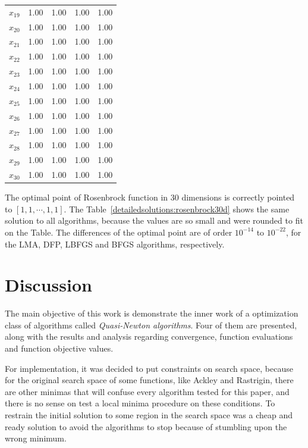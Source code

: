 \documentclass[conference]{IEEEtran}
\begin{document}
\begin{table}[H]
\begin{tabular}{lrrrr}
$x_{19}$ &     1.00 &     1.00 &     1.00 &     1.00 \\
$x_{20}$ &     1.00 &     1.00 &     1.00 &     1.00 \\
$x_{21}$ &     1.00 &     1.00 &     1.00 &     1.00 \\
$x_{22}$ &     1.00 &     1.00 &     1.00 &     1.00 \\
$x_{23}$ &     1.00 &     1.00 &     1.00 &     1.00 \\
$x_{24}$ &     1.00 &     1.00 &     1.00 &     1.00 \\
$x_{25}$ &     1.00 &     1.00 &     1.00 &     1.00 \\
$x_{26}$ &     1.00 &     1.00 &     1.00 &     1.00 \\
$x_{27}$ &     1.00 &     1.00 &     1.00 &     1.00 \\
$x_{28}$ &     1.00 &     1.00 &     1.00 &     1.00 \\
$x_{29}$ &     1.00 &     1.00 &     1.00 &     1.00 \\
$x_{30}$ &     1.00 &     1.00 &     1.00 &     1.00 \\
\bottomrule
\end{tabular}
\end{table}

The optimal point of Rosenbrock function in 30 dimensions is correctly pointed to $\left[1, 1, \cdots , 1, 1\right]$. The Table~\ref{detailedsolutions:rosenbrock30d}
shows the same solution to all algorithms, because the values are so small and were rounded to fit on the Table. The differences of
the optimal point are of order $10^{-14}$ to $10^{-22}$, for the LMA, DFP, LBFGS and BFGS algorithms, respectively.


\section{Discussion}

The main objective of this work is demonstrate the inner work of a optimization class of algorithms called \textit{Quasi-Newton algorithms}. Four of them are presented, along with the results and analysis regarding convergence, function evaluations and function objective values.

For implementation, it was decided to put constraints on search space, because for the original search space of some functions, like Ackley and Rastrigin, there are other minimas that will confuse every algorithm tested for this paper, and there is no sense on test a local minima procedure on these conditions. To restrain the initial solution to some region in the search space was a cheap and ready solution to avoid the algorithms to stop because of stumbling upon the wrong minimum.
\end{document}
